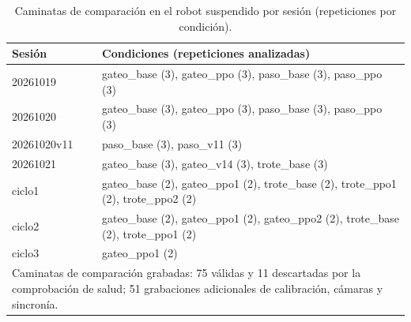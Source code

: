 \begin{table}[H]
\centering
\small
\caption{Caminatas de comparación en el robot suspendido por sesión (repeticiones por condición).}
\label{tab:inventario-ensayos}
\begin{tabular}{l>{\raggedright\arraybackslash}p{}}
\toprule
Sesión & Condiciones (repeticiones analizadas) \\
\midrule
20261019 & gateo\_base (3), gateo\_ppo (3), paso\_base (3), paso\_ppo (3) \\
20261020 & gateo\_base (3), gateo\_ppo (3), paso\_base (3), paso\_ppo (3) \\
20261020v11 & paso\_base (3), paso\_v11 (3) \\
20261021 & gateo\_base (3), gateo\_v14 (3), trote\_base (3) \\
ciclo1 & gateo\_base (2), gateo\_ppo1 (2), trote\_base (2), trote\_ppo1 (2), trote\_ppo2 (2) \\
ciclo2 & gateo\_base (2), gateo\_ppo1 (2), gateo\_ppo2 (2), trote\_base (2), trote\_ppo1 (2) \\
ciclo3 & gateo\_ppo1 (2) \\
\midrule
\multicolumn{2}{p{0.9\textwidth}}{\footnotesize Caminatas de comparación grabadas: 75 válidas y 11 descartadas por la comprobación de salud; 51 grabaciones adicionales de calibración, cámaras y sincronía.} \\
\bottomrule
\end{tabular}
\end{table}
